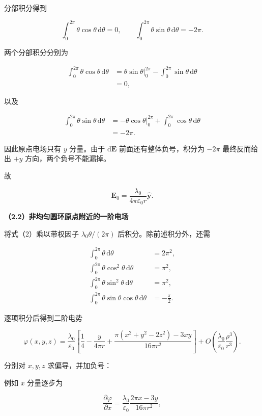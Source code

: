 \documentclass[12pt,a4paper,UTF8]{ctexart}
\begin{document}
分部积分得到

\[\int_0^{2\pi}\theta\cos\theta\,\mathrm d\theta=0,\qquad
\int_0^{2\pi}\theta\sin\theta\,\mathrm d\theta=-2\pi.\]

两个分部积分分别为

\[\begin{aligned}
\int_0^{2\pi}\theta\cos\theta\,\mathrm d\theta
&=\left.\theta\sin\theta\right|_0^{2\pi}
-\int_0^{2\pi}\sin\theta\,\mathrm d\theta\\
&=0,
\end{aligned}\]

以及

\[\begin{aligned}
\int_0^{2\pi}\theta\sin\theta\,\mathrm d\theta
&=\left.-\theta\cos\theta\right|_0^{2\pi}
+\int_0^{2\pi}\cos\theta\,\mathrm d\theta\\
&=-2\pi.
\end{aligned}\]

因此原点电场只有 \(y\) 分量。由于 \(\mathrm d\boldsymbol E\)
前面还有整体负号，积分为 \(-2\pi\) 最终反而给出 \(+y\)
方向，两个负号不能漏掉。

故

\[\boxed{
\boldsymbol E_0=\frac{\lambda_0}{4\pi\varepsilon_0r}
\hat{\boldsymbol y}
}. \tag{7}\]

\textbf{（2.2）非均匀圆环原点附近的一阶电场}

将式（2）乘以带权因子 \(\lambda_0\theta/(2\pi)\)
后积分。除前述积分外，还需

\[\begin{aligned}
\int_0^{2\pi}\theta\,\mathrm d\theta&=2\pi^2,\\
\int_0^{2\pi}\theta\cos^2\theta\,\mathrm d\theta&=\pi^2,\\
\int_0^{2\pi}\theta\sin^2\theta\,\mathrm d\theta&=\pi^2,\\
\int_0^{2\pi}\theta\sin\theta\cos\theta\,\mathrm d\theta&=-\frac\pi2.
\end{aligned}\]

逐项积分后得到二阶电势

\[\boxed{
\varphi(x,y,z)=\frac{\lambda_0}{\varepsilon_0}
\left[
\frac14-\frac{y}{4\pi r}
+\frac{\pi(x^2+y^2-2z^2)-3xy}{16\pi r^2}
\right]+O\!\left(\frac{\lambda_0}{\varepsilon_0}\frac{\rho^3}{r^3}\right)
}. \tag{8}\]

分别对 \(x,y,z\) 求偏导，并加负号：

例如 \(x\) 分量逐步为

\[\frac{\partial\varphi}{\partial x}
=\frac{\lambda_0}{\varepsilon_0}
\frac{2\pi x-3y}{16\pi r^2},\]
\end{document}
